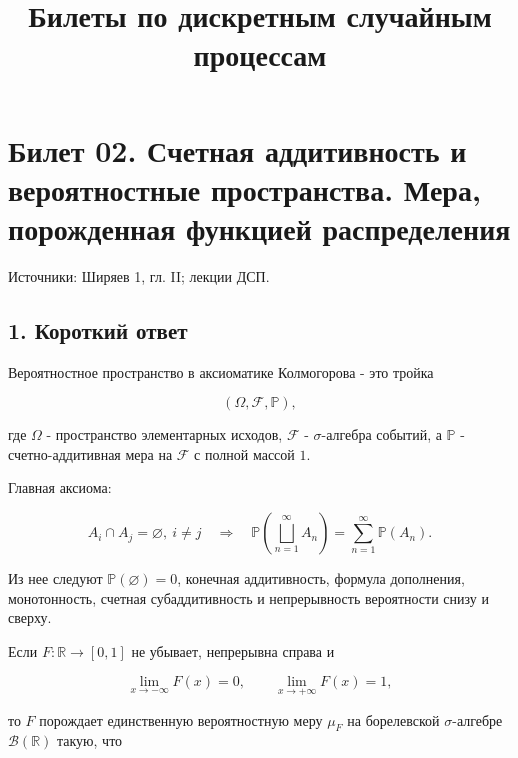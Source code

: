 \documentclass[
  11pt,
  a4paper,
]{article}
\title{Билеты по дискретным случайным процессам}
\author{}
\date{}
\begin{document}
\maketitle

\section{Билет 02. Счетная аддитивность и вероятностные пространства.
Мера, порожденная функцией
распределения}\label{ux431ux438ux43bux435ux442-02.-ux441ux447ux435ux442ux43dux430ux44f-ux430ux434ux434ux438ux442ux438ux432ux43dux43eux441ux442ux44c-ux438-ux432ux435ux440ux43eux44fux442ux43dux43eux441ux442ux43dux44bux435-ux43fux440ux43eux441ux442ux440ux430ux43dux441ux442ux432ux430.-ux43cux435ux440ux430-ux43fux43eux440ux43eux436ux434ux435ux43dux43dux430ux44f-ux444ux443ux43dux43aux446ux438ux435ux439-ux440ux430ux441ux43fux440ux435ux434ux435ux43bux435ux43dux438ux44f}

Источники: Ширяев 1, гл. II; лекции ДСП.

\subsection{1. Короткий
ответ}\label{ux43aux43eux440ux43eux442ux43aux438ux439-ux43eux442ux432ux435ux442}

Вероятностное пространство в аксиоматике Колмогорова - это тройка

\[
(\Omega,\mathcal F,\mathbb P),
\]

где \(\Omega\) - пространство элементарных исходов, \(\mathcal F\) -
\(\sigma\)-алгебра событий, а \(\mathbb P\) - счетно-аддитивная мера на
\(\mathcal F\) с полной массой \(1\).

Главная аксиома:

\[
A_i\cap A_j=\varnothing,\ i\ne j
\quad\Longrightarrow\quad
\mathbb P\left(\bigsqcup_{n=1}^{\infty} A_n\right)
=
\sum_{n=1}^{\infty}\mathbb P(A_n).
\]

Из нее следуют \(\mathbb P(\varnothing)=0\), конечная аддитивность,
формула дополнения, монотонность, счетная субаддитивность и
непрерывность вероятности снизу и сверху.

Если \(F:\mathbb R\to[0,1]\) не убывает, непрерывна справа и

\[
\lim_{x\to-\infty}F(x)=0,\qquad
\lim_{x\to+\infty}F(x)=1,
\]

то \(F\) порождает единственную вероятностную меру \(\mu_F\) на
борелевской \(\sigma\)-алгебре \(\mathcal B(\mathbb R)\) такую, что
\end{document}
